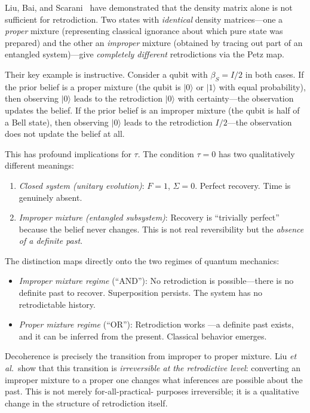 \documentclass[12pt]{article}
\theoremstyle{definition}
\theoremstyle{remark}
\newcommand{\ket}[1]{|#1\rangle}
\newcommand{\tauasym}{\tau}
\begin{document}
Liu, Bai, and Scarani~\cite{Liu2026} have demonstrated that
the density matrix alone is not sufficient for retrodiction.
Two states with \emph{identical} density matrices---one a
\emph{proper} mixture (representing classical ignorance about which
pure state was prepared) and the other an \emph{improper} mixture
(obtained by tracing out part of an entangled system)---give
\emph{completely different} retrodictions via the Petz map.

Their key example is instructive.  Consider a qubit with
$\beta_S = I/2$ in both cases.  If the prior belief is a proper
mixture (the qubit is $\ket{0}$ or $\ket{1}$ with equal
probability), then observing $\ket{0}$ leads to the retrodiction
$\ket{0}$ with certainty---the observation updates the belief.
If the prior belief is an improper mixture (the qubit is half of a
Bell state), then observing $\ket{0}$ leads to the retrodiction
$I/2$---the observation does not update the belief at all.

This has profound implications for $\tauasym$.  The condition
$\tauasym = 0$ has two qualitatively different meanings:
\begin{enumerate}
\item \emph{Closed system (unitary evolution)}: $F = 1$,
$\Sigma = 0$.  Perfect recovery.  Time is genuinely absent.
\item \emph{Improper mixture (entangled subsystem)}: Recovery is
``trivially perfect'' because the belief never changes.
This is not real reversibility but the \emph{absence of a
definite past}.
\end{enumerate}

The distinction maps directly onto the two regimes of quantum
mechanics:
\begin{itemize}
\item \emph{Improper mixture regime} (``AND''): No retrodiction
is possible---there is no definite past to recover.
Superposition persists.  The system has no retrodictable history.
\item \emph{Proper mixture regime} (``OR''): Retrodiction works
---a definite past exists, and it can be inferred from
the present.  Classical behavior emerges.
\end{itemize}

Decoherence is precisely the transition from improper to proper
mixture.  Liu \emph{et al.}\ show that this transition is
\emph{irreversible at the retrodictive level}: converting an
improper mixture to a proper one changes what inferences are
possible about the past.  This is not merely for-all-practical-
purposes irreversible; it is a qualitative change in the structure
of retrodiction itself.
\end{document}
